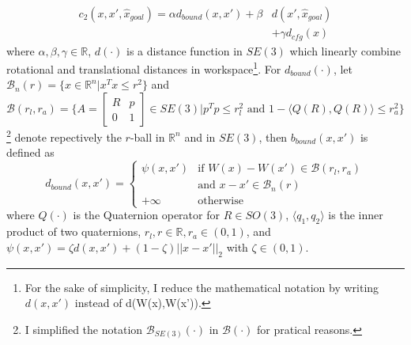 \begin{equation}\label{eq:cost2}
\begin{aligned}
c_2(x,x',\hat{x}_{goal})=\alpha d_{bound}(x,x') +\beta &d(x',\hat{x}_{goal})\\
&+\gamma d_{cfg}(x)
\end{aligned}
\end{equation} 
where $\alpha,\beta,\gamma\in\mathbb{R}$, $d(\cdot)$ is a distance function in $SE(3)$ which linearly combine rotational and translational distances in workspace\footnote{For the sake of simplicity, I reduce the mathematical notation by writing $d(x,x')$ instead of d(W(x),W(x')).}. For $d_{bound}(\cdot)$, let $\mathcal{B}_n(r)=\{x\in\mathbb{R}^n|x^Tx\leq r^2\}$ and $\mathcal{B}(r_{l},r_{a})=\{A=[\begin{smallmatrix}R&p\\ 0&1\end{smallmatrix}]\in SE(3)|p^Tp\leq r_{l}^2\text{ and } 1-\langle Q(R),Q(R)\rangle\leq r_{a}^2\}$\footnote{I simplified the notation $\mathcal{B}_{SE(3)}(\cdot)$ in $\mathcal{B}(\cdot)$ for pratical reasons.} denote repectively the $r$-ball in $\mathbb{R}^n$ and in $SE(3)$, then $b_{bound}(x,x')$ is defined as %
$$
d_{bound}(x,x')=
\begin{cases}
\psi(x,x')& \text{if }W(x)-W(x')\in\mathcal{B}(r_{l},r_{a}) \\
& \text{and }x-x'\in\mathcal{B}_n(r) \\
+\infty & \text{otherwise}
\end{cases}
$$
where $Q(\cdot)$ is the Quaternion operator for $R\in SO(3)$, $\langle q_1,q_2\rangle$ is the inner product of two quaternions, $r_{l}, r\in\mathbb{R}, r_{a}\in (0,1)$, and $\psi(x,x')=\zeta d(x,x')+(1-\zeta)||x-x'||_2$ with $\zeta\in(0,1)$.
